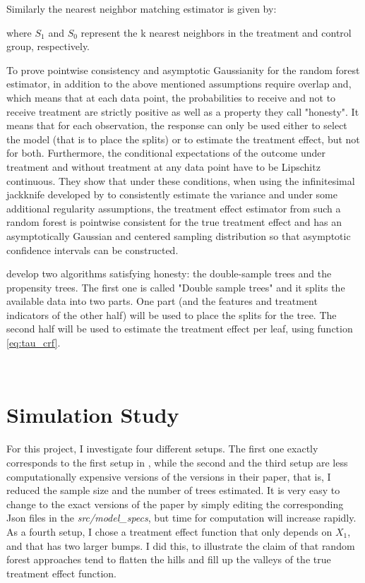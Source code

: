 \documentclass[11pt, a4paper, leqno]{article}
\begin{document}
Similarly the nearest neighbor matching estimator is given by: 

where \(S_1\) and \(S_0\) represent the k nearest neighbors in the treatment and control group, respectively.   

To prove pointwise consistency and asymptotic Gaussianity for the random forest estimator, in addition to the above mentioned assumptions \cite{wa18} require overlap and, which means that at each data point, the probabilities to receive and not to receive treatment are strictly positive as well as a property they call "honesty". It means that for each observation, the response can only be used either to select the model (that is to place the splits) or to estimate the treatment effect, but not for both. Furthermore, the conditional expectations of the outcome under treatment and without treatment at any data point have to be Lipschitz continuous.
They show that under these conditions, when using the infinitesimal jackknife developed by \cite{e14} to consistently estimate the variance and under some additional regularity assumptions, the treatment effect estimator from such a random forest is pointwise consistent for the true treatment effect and has an asymptotically Gaussian and centered sampling distribution so that asymptotic confidence intervals can be constructed. 

\cite{wa18} develop two algorithms satisfying honesty: the double-sample trees and the propensity trees. The first one is called "Double sample trees" and it splits the available data into two parts. One part (and the features and treatment indicators of the other half) will be used to place the splits for the tree. The second half will be used to estimate the treatment effect per leaf, using function \ref{eq:tau_crf}.



\(\) \(\) 


\section{Simulation Study} %
\label{sec:simulation}

For this project, I investigate four different setups. The first one exactly corresponds to the first setup in \cite{wa18}, while the second and the third setup are less computationally expensive versions of the versions in their paper, that is, I reduced the sample size and the number of trees estimated. It is very easy to change to the exact versions of the paper by simply editing the corresponding Json files in the \textit{src/model\_specs}, but time for computation will increase rapidly. As a fourth setup, I chose a treatment effect function that only depends on \(X_1\), and that has two larger bumps. I did this, to illustrate the claim of \cite[p.~1238]{wa18} that random forest approaches tend to flatten the hills and fill up the valleys of the true treatment effect function.
\end{document}
